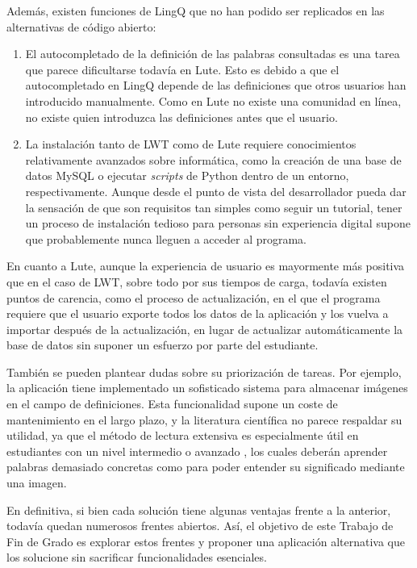 Además, existen funciones de LingQ que no han podido ser replicados en las alternativas de código abierto:
\begin{enumerate}
	\item El autocompletado de la definición de las palabras consultadas es una tarea que parece dificultarse todavía en Lute. Esto es debido a que el autocompletado en LingQ depende de las definiciones que otros usuarios han introducido manualmente. Como en Lute no existe una comunidad en línea, no existe quien introduzca las definiciones antes que el usuario.
	\item La instalación tanto de LWT como de Lute requiere conocimientos relativamente avanzados sobre informática, como la creación de una base de datos MySQL o ejecutar \textit{scripts} de Python dentro de un entorno, respectivamente. Aunque desde el punto de vista del desarrollador pueda dar la sensación de que son requisitos tan simples como seguir un tutorial, tener un proceso de instalación tedioso para personas sin experiencia digital supone que probablemente nunca lleguen a acceder al programa. \citationNeeded
\end{enumerate}

En cuanto a Lute, aunque la experiencia de usuario es mayormente más positiva que en el caso de LWT, sobre todo por sus tiempos de carga, todavía existen puntos de carencia, como el proceso de actualización, en el que el programa requiere que el usuario exporte todos los datos de la aplicación y los vuelva a importar después de la actualización, en lugar de actualizar automáticamente la base de datos sin suponer un esfuerzo por parte del estudiante.

También se pueden plantear dudas sobre su priorización de tareas. Por ejemplo, la aplicación tiene implementado un sofisticado sistema para almacenar imágenes en el campo de definiciones. Esta funcionalidad supone un coste de mantenimiento en el largo plazo, y la literatura científica no parece respaldar su utilidad, ya que el método de lectura extensiva es especialmente útil en estudiantes con un nivel intermedio o avanzado \citationNeeded, los cuales deberán aprender palabras demasiado concretas como para poder entender su significado mediante una imagen.

En definitiva, si bien cada solución tiene algunas ventajas frente a la anterior, todavía quedan numerosos frentes abiertos. Así, el objetivo de este Trabajo de Fin de Grado es explorar estos frentes y proponer una aplicación alternativa que los solucione sin sacrificar funcionalidades esenciales.
